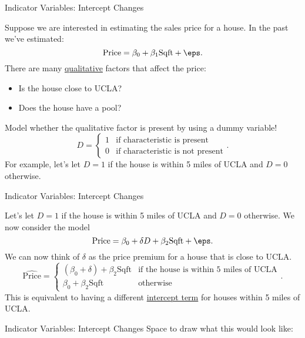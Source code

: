 \documentclass[notheorems, 9pt, handout]{beamer}
\begin{document}
\begin{frame}{Indicator Variables: Intercept Changes} %
	\label{frame:intercept-changes} %
	\begin{example*}
		Suppose we are interested in estimating the sales price for a house. In the past we've estimated:
		\[
			\text{Price} = \beta_0 + \beta_1\text{Sqft} + \eps
		.\]
		 There are many \underline{qualitative} factors that affect the price:
		\begin{itemize}
			\item Is the house close to UCLA?
			\item Does the house have a pool?
		\end{itemize}
		\vspace{0.3cm}
		 Model whether the qualitative factor is present by using a dummy variable!
		\[
		    D = \begin{cases}
		    	1 & \text{if characteristic is present} \\
				0 & \text{if characteristic is not present}
		    \end{cases}
		.\] 
		For example, let's let \(D= 1\) if the house is within 5 miles of UCLA and  \(D= 0\) otherwise.
	\end{example*}
\end{frame}
\begin{frame}{Indicator Variables: Intercept Changes} %
	\begin{example*}
		Let's let \(D= 1\) if the house is within 5 miles of UCLA and  \(D= 0\) otherwise. We now consider the model 
		\[
			\text{Price} = \beta_0 + \delta D + \beta_2\text{Sqft} + \eps
		.\] 
		 We can now think of \(\delta\) as the price premium for a house that is close to UCLA.
		\[
			\widehat{\text{Price}} = \begin{cases}
				(\beta_0 + \delta)  + \beta_2\text{Sqft}& \text{if the house is within 5 miles of UCLA} \\
				\beta_0 + \beta_2\text{Sqft} &\text{otherwise}
			\end{cases}
		.\] 
		This is equivalent to having a different \underline{intercept term} for houses within 5 miles of UCLA. 
	\end{example*}
\end{frame}
\begin{frame}[t]{Indicator Variables: Intercept Changes} %
	\label{frame:indicator-intercept} %
	Space to draw what this would look like:
\end{frame}
\end{document}
